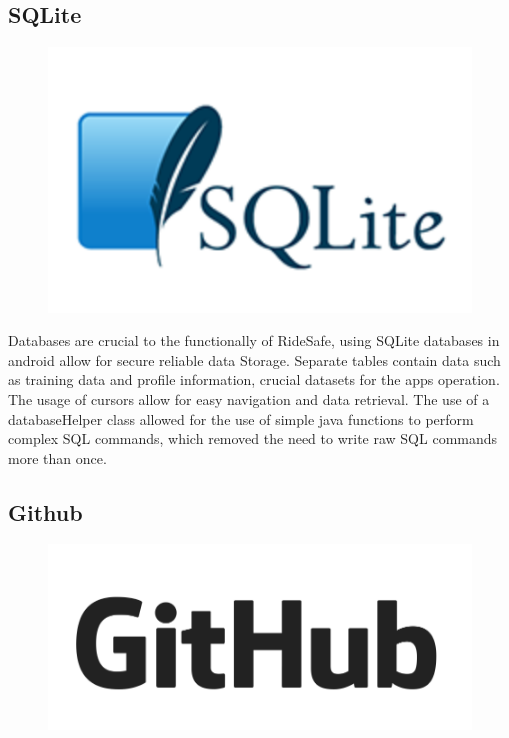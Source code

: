 \subsection{SQLite}

\begin{figure}
\begin{center}
\includegraphics[scale = 0.5] {implementation/SQLite.png}
\end{center}

\label{sql}
\end{figure}





Databases are crucial to the functionally of RideSafe, using SQLite databases in android allow for secure reliable data Storage. Separate tables contain data such as training data and profile information, crucial datasets for the apps operation.  The usage of cursors allow for easy navigation and data retrieval. The use of a databaseHelper class allowed for the use of simple java functions to perform complex SQL commands, which removed the need to write raw SQL commands more than once.

\subsection{Github}
\begin{figure}
\begin{center}
\includegraphics[scale = 0.4] {implementation/github.png}
\end{center}

\label{git}
\end{figure}




